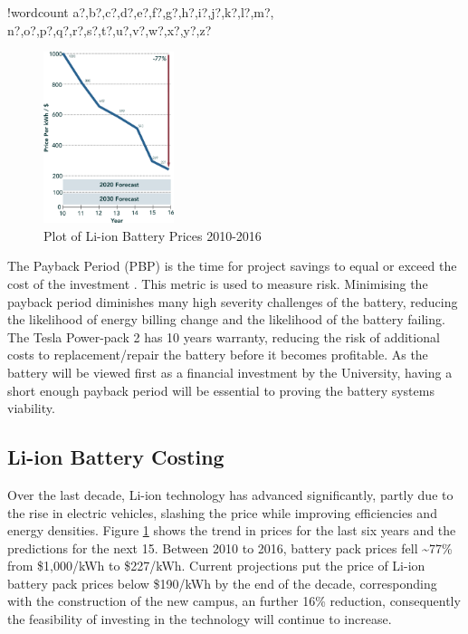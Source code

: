 \documentclass[fontsize=9.5pt]{extarticle}
\numberwithin{figure}{section} %
\newcounter{words}
\newenvironment{counted}{%
  \setcounter{words}{0}
  \SearchList!{wordcount}{\stepcounter{words}}
    {a?,b?,c?,d?,e?,f?,g?,h?,i?,j?,k?,l?,m?,
    n?,o?,p?,q?,r?,s?,t?,u?,v?,w?,x?,y?,z?}
  \UndoBoundary{'}
  \SearchOrder{p;}}{%
  \StopSearching}
\begin{document}
\begin{counted}
\begin{figure}
  \begin{center}
    \vspace{-45pt}
 \includegraphics[trim = 0 0 0 0, clip, width=0.34\textwidth]{BatPrice.eps}
  \end{center}
  \vspace{-5pt}
  \caption{Plot of Li-ion Battery Prices 2010-2016 \cite{mckBat}}
  \vspace{-30pt}
  \label{mckBatPrice}
\end{figure}

The Payback Period (PBP) is the time for project savings to equal or
exceed the cost of the investment \cite{diorio2015economic}. This metric
is used to measure risk. Minimising the payback period diminishes many
high severity challenges of the battery, reducing the likelihood of
energy billing change and the likelihood of the battery failing. The
Tesla Power-pack 2 has 10 years warranty, reducing the risk of
additional costs to replacement/repair the battery before it becomes
profitable. As the battery will be viewed first as a financial
investment by the University, having a short enough payback period will
be essential to proving the battery systems viability.

\subsection{Li-ion Battery Costing}\label{li-ion-battery-costing}

Over the last decade, Li-ion technology has advanced significantly,
partly due to the rise in electric vehicles, slashing the price while
improving efficiencies and energy densities. Figure \ref{mckBatPrice}
shows the trend in prices for the last six years and the predictions for
the next 15. Between 2010 to 2016, battery pack prices fell
\textasciitilde{}77\% from \$1,000/kWh to \$227/kWh. Current projections
put the price of Li-ion battery pack prices below \$190/kWh by the end
of the decade, corresponding with the construction of the new campus, an
further 16\% reduction, consequently the feasibility of investing in the
technology will continue to increase.


\end{counted}
\end{document}
